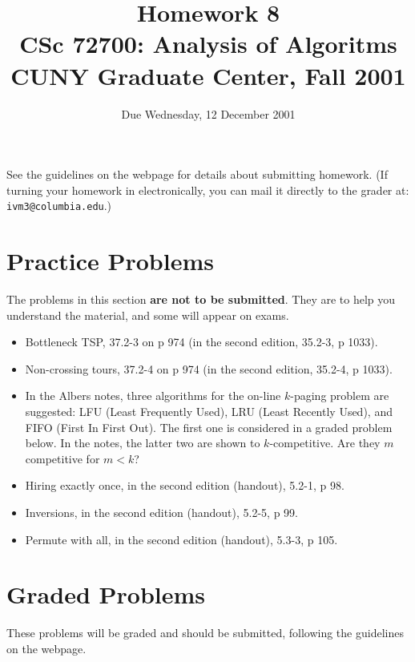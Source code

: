 \documentclass[11pt]{article}
\begin{document}
\title{Homework 8\\
       CSc 72700: Analysis of Algoritms\\
       CUNY Graduate Center, Fall 2001 }
\date{Due Wednesday, 12 December 2001}
\author{}
\maketitle

See the guidelines on the webpage for details about submitting homework.
(If turning your homework in electronically, you can mail it directly
to the grader at: {\tt ivm3@columbia.edu}.)

\section*{Practice Problems}

The problems in this section {\bf are not to be submitted}.  They are to
help you understand the material, and some will appear on exams.

\begin{itemize}
    \item Bottleneck TSP, 37.2-3 on p 974
	(in the second edition, 35.2-3, p 1033).
    \item Non-crossing tours, 37.2-4 on p 974
	(in the second edition, 35.2-4, p 1033).
    \item In the Albers notes, three algorithms for the on-line 
	$k$-paging problem are suggested: LFU (Least Frequently Used),
	LRU (Least Recently Used), and FIFO (First In First Out).  The
	first one is considered in a graded problem below.  In the notes,
	the latter two are shown to $k$-competitive.  Are they $m$
	competitive for $m < k$?
    \item Hiring exactly once,
	in the second edition (handout), 5.2-1, p 98.
    \item Inversions,
	in the second edition (handout), 5.2-5, p 99.
    \item Permute with all,
	in the second edition (handout), 5.3-3, p 105.
\end{itemize}

\section*{Graded Problems}

These problems will be graded and should be submitted, following the
guidelines on the webpage.
\end{document}
